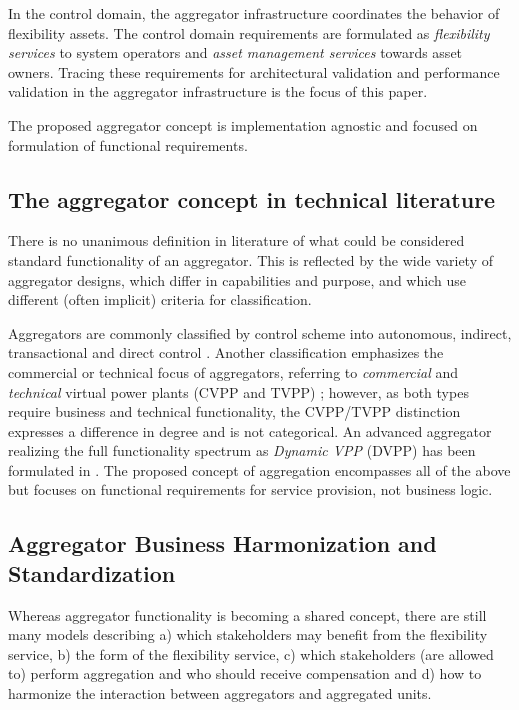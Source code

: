 In the control domain, the aggregator infrastructure coordinates the behavior of flexibility assets. The control domain requirements are formulated as \emph{flexibility services} to system operators and \emph{asset management services} towards asset owners. Tracing these requirements for architectural validation and performance validation in the aggregator infrastructure is the focus of this paper.

The proposed aggregator concept is implementation agnostic and focused on formulation of functional requirements.

\subsection{The aggregator concept in technical literature}
There is no unanimous definition in literature of what could be considered standard functionality of an aggregator. This is reflected by the wide variety of aggregator designs\cite{kok2005powermatcher,han2010development,sortomme2011optimal,costanzo2013coordination}, which differ in capabilities and purpose, and which use different (often implicit) criteria for classification.

Aggregators are commonly classified by control scheme into autonomous, indirect, transactional and direct control \cite{kosek2013overview}. Another classification emphasizes the commercial or technical focus of aggregators, referring to \emph{commercial} and \emph{technical} virtual power plants (CVPP and TVPP) \cite{fenix2009}; however, as both types require business and technical functionality, the CVPP/TVPP distinction expresses a difference in degree and is not categorical. An advanced aggregator realizing the full functionality spectrum as \emph{Dynamic VPP} (DVPP) has been formulated in \cite{niesse2014conjoint}. 
The proposed concept of aggregation encompasses all of the above but focuses on functional requirements for service provision, not business logic.

\subsection{Aggregator Business Harmonization and Standardization}
Whereas aggregator functionality is becoming a shared concept, there are still many models describing a) which stakeholders may benefit from the flexibility service, b) the form of the flexibility service, c) which stakeholders (are allowed to) perform aggregation and who should receive compensation \cite{eurel-aggr} and d) how to harmonize the interaction between aggregators and aggregated units.


